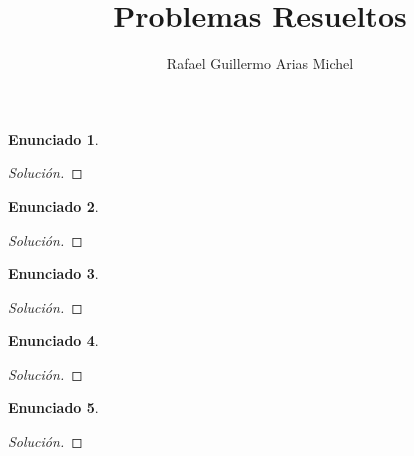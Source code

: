 \documentclass{article}
\title{Problemas Resueltos}
\author{Rafael Guillermo Arias Michel}
\date{\displaydate{fecha}}
\theoremstyle{definition}
\newtheorem{enunciado}{Enunciado}
\newenvironment{ejercicio}{\begin{enunciado}}{\end{enunciado}}
\newenvironment{solucion}{\begin{proof}[Solución]}{\end{proof}}
\begin{document}
	\maketitle

	\begin{ejercicio}\end{ejercicio}
	\begin{solucion}\end{solucion}

	\begin{ejercicio}\end{ejercicio}
	\begin{solucion}\end{solucion}

	\begin{ejercicio}\end{ejercicio}
	\begin{solucion}\end{solucion}

	\begin{ejercicio}\end{ejercicio}
	\begin{solucion}\end{solucion}

	\begin{ejercicio}\end{ejercicio}
	\begin{solucion}\end{solucion}
\end{document}
